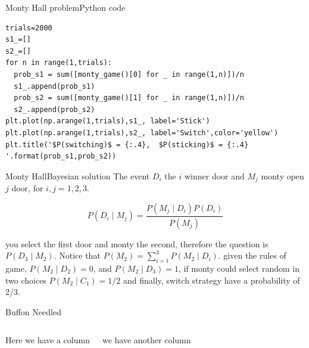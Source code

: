 \documentclass{beamer}
\begin{document}
\begin{frame}[fragile]{Monty Hall problem}{Python code}
\begin{lstlisting}
trials=2000
s1_=[]
s2_=[]
for n in range(1,trials):
  prob_s1 = sum([monty_game()[0] for _ in range(1,n)])/n
  s1_.append(prob_s1)
  prob_s2 = sum([monty_game()[1] for _ in range(1,n)])/n
  s2_.append(prob_s2)
plt.plot(np.arange(1,trials),s1_, label='Stick')
plt.plot(np.arange(1,trials),s2_, label='Switch',color='yellow')
plt.title('$P(switching)$ = {:.4},  $P(sticking)$ = {:.4} '.format(prob_s1,prob_s2))
\end{lstlisting}
\end{frame}



\begin{frame}{Monty Hall}{Bayesian solution}
The event $D_{i}$ the $i$ winner door and  $M_{j}$ monty open $j$ door, for $i,j=1,2,3$.

\begin{equation}
P(D_{i} \mid M_{j}) = \frac{P(M_{j} \mid D_{i})P(D_{i})}{P(M_{j})}
\end{equation}

you select the first door  and monty the second, therefore the question  is $P(D_{3} \mid M_{2})$.
Notice that $ P(M_{2}) = \sum_{i=1}^{3} P(M_{2} \mid D_{i}) $.  
given the rules of game, 
$P(M_{2} \mid D_{2}) = 0$, and 
$P(M_{2} \mid D_{3}) = 1$, if monty could select random in two choices $P(M_{2} \mid C_{1})=1/2$ and finally, switch strategy have a probability of 2/3.
\end{frame}







\begin{frame}{Buffon Needled}
\begin{columns}

Here we have a column



we have another column


\end{columns}

\end{frame}
\end{document}
